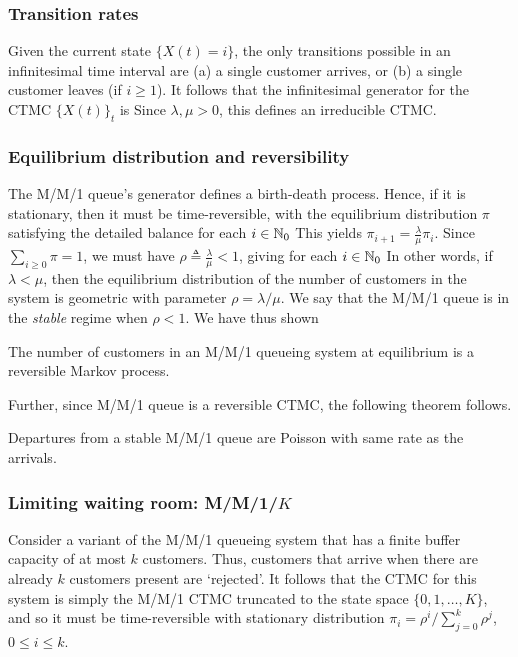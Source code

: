 \documentclass[a4paper,10pt,english]{article}
\begin{document}
\subsubsection{Transition rates} 
Given the current state $\{X(t) = i\}$, the only transitions possible in an infinitesimal time interval are (a) a single customer arrives, or (b) a single customer leaves (if $i \geq 1$). 
It follows that the infinitesimal generator for the CTMC $\{X(t)\}_t$ is 
Since $\lambda, \mu > 0$, this defines an irreducible CTMC. 

\subsubsection{Equilibrium distribution and reversibility} 
The M/M/1 queue's generator defines a birth-death process.  %
Hence, if it is stationary, then it must be time-reversible, with the equilibrium distribution $\pi$ satisfying the detailed balance for each $i \in \mathbb{N}_0$
This yields $\pi_{i+1} = \frac{\lambda}{\mu} \pi_i$. 
Since $\sum_{i \geq 0} \pi = 1$, we must have $\rho \triangleq \frac{\lambda}{\mu} < 1$, giving for each $i \in \mathbb{N}_0$
In other words, if $\lambda < \mu$, then the equilibrium distribution of the number of customers in the system is geometric with parameter $\rho = \lambda/\mu$. 
We say that the M/M/1 queue is in the \textit{stable} regime when $\rho < 1$. 
We have thus shown 
\begin{cor} 
The number of customers in an M/M/1 queueing system at equilibrium is a reversible Markov process.
\end{cor}
Further, since M/M/1 queue is a reversible CTMC, the following theorem follows. 
\begin{thm}[Burke] 
Departures from a stable M/M/1 queue are Poisson with same rate as the arrivals.
\end{thm}

\subsubsection{Limiting waiting room: M/M/1/$K$} 
Consider a variant of the M/M/1 queueing system that has a finite buffer capacity of at most $k$ customers. Thus, customers that arrive when there are already $k$ customers present are `rejected'. It follows that the CTMC for this system is simply the M/M/1 CTMC truncated to the state space $\{0, 1, \ldots, K\}$, and so it must be time-reversible with stationary distribution $\pi_i = \rho^i / \sum_{j = 0}^k \rho^j$, $0 \leq i \leq k$. 
\end{document}
